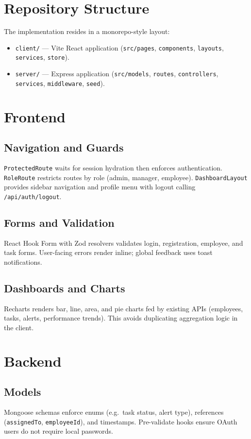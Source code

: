 \section{Repository Structure}
The implementation resides in a monorepo-style layout:
\begin{itemize}
  \item \texttt{client/} --- Vite React application (\texttt{src/pages}, \texttt{components}, \texttt{layouts}, \texttt{services}, \texttt{store}).
  \item \texttt{server/} --- Express application (\texttt{src/models}, \texttt{routes}, \texttt{controllers}, \texttt{services}, \texttt{middleware}, \texttt{seed}).
\end{itemize}

\section{Frontend}
\subsection{Navigation and Guards}
\texttt{ProtectedRoute} waits for session hydration then enforces authentication. \texttt{RoleRoute} restricts routes by role (admin, manager, employee). \texttt{DashboardLayout} provides sidebar navigation and profile menu with logout calling \texttt{/api/auth/logout}.

\subsection{Forms and Validation}
React Hook Form with Zod resolvers validates login, registration, employee, and task forms. User-facing errors render inline; global feedback uses toast notifications.

\subsection{Dashboards and Charts}
Recharts renders bar, line, area, and pie charts fed by existing APIs (employees, tasks, alerts, performance trends). This avoids duplicating aggregation logic in the client.

\section{Backend}
\subsection{Models}
Mongoose schemas enforce enums (e.g.\ task status, alert type), references (\texttt{assignedTo}, \texttt{employeeId}), and timestamps. Pre-validate hooks ensure OAuth users do not require local passwords.

